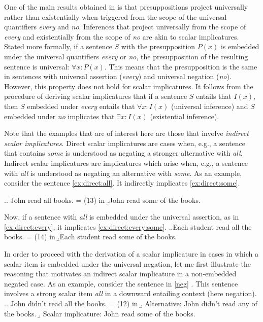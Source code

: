 One of the main results obtained in \citealt{Chemla:09} is that presuppositions project universally rather than existentially when triggered from the scope of the universal quantifiers \textit{every} and \textit{no}. Inferences that project universally from the scope of \textit{every} and existentially from the scope of \textit{no} are akin to scalar implicatures. Stated more formally, if a sentence $S$ with the presupposition $P(x)$ is embedded under the universal quantifiers \textit{every} or \textit{no}, the presupposition of the resulting sentence is universal: $\forall x: P(x)$. This means that the presupposition is the same in sentences with universal assertion (\textit{every}) and universal negation (\textit{no}). However, this property does not hold for scalar implicatures. It follows from the procedure of deriving scalar implicatures that if a sentence $S$ entails that $I(x)$, then $S$ embedded under \textit{every} entails that $\forall x: I(x)$ (universal inference) and $S$ embedded under \textit{no} implicates that $\exists x: I(x)$ (existential inference).

Note that the examples that are of interest here are those that involve \textit{indirect scalar implicatures}. Direct scalar implicatures are cases when, e.g., a sentence that contains \textit{some} is understood as negating a stronger alternative with \textit{all}. Indirect scalar implicatures are implicatures which arise when, e.g., a sentence with \textit{all} is understood as negating an alternative with \textit{some}. As an example, consider the sentence \ref{ex:direct:all}. It indirectly implicates \ref{ex:direct:some}.

\ex.\a. \label{ex:direct:all}John read all books. \hfill = (13) in \citealt{Chemla:09}
\b.\label{ex:direct:some}John read some of the books.

Now, if a sentence with \textit{all} is embedded under the universal assertion, as in \ref{ex:direct:every}, it implicates \ref{ex:direct:every:some}.
\ex.\a.\label{ex:direct:every}Each student read all the books. \hfill = (14) in \citealt{Chemla:09}
\b.\label{ex:direct:every:some}Each student read some of the books.

In order to proceed with the derivation of a scalar implicature in cases in which a scalar item is embedded under the universal negation, let me first illustrate the reasoning that motivates an indirect scalar implicature in a non-embedded negated case. As an example, consider the sentence in \ref{neg} \citep[taken from][]{Chemla:09}. This sentence involves a strong scalar item \textit{all} in a downward entailing context (here negation).
\ex.\a. \label{neg} John didn't read all the books. \hfill = (12) in \citealt{Chemla:09}
\b. \label{alt} Alternative: John didn't read any of the books.
\b. \label{si} Scalar implicature: John read some of the books.


